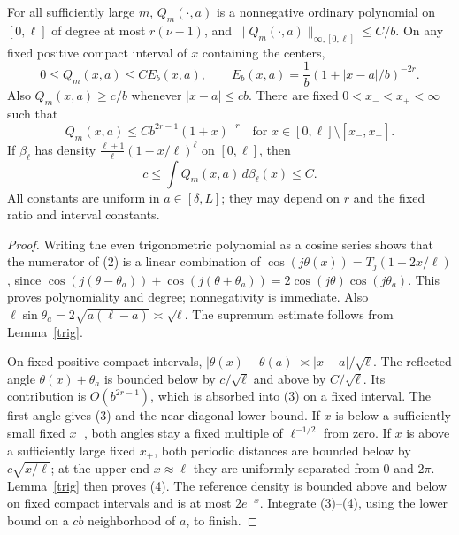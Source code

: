 \documentclass[11pt]{article}
\begin{document}
\begin{theorem}\label{kernel}
For all sufficiently large $m$, $Q_m(\cdot,a)$ is a nonnegative
ordinary polynomial on $[0,\ell]$ of degree at most $r(\nu-1)$,
and $\|Q_m(\cdot,a)\|_{\infty,[0,\ell]}\le C/b$.
On any fixed positive compact interval of $x$ containing the centers,
\[
 0\le Q_m(x,a)\le C E_b(x,a),\qquad
 E_b(x,a)=\frac1b(1+|x-a|/b)^{-2r}.                       \tag{3}
\]
Also $Q_m(x,a)\ge c/b$ whenever $|x-a|\le cb$.
There are fixed $0<x_-<x_+<\infty$ such that
\[
 Q_m(x,a)\le C b^{2r-1}(1+x)^{-r}
 \quad\text{for }x\in[0,\ell]\setminus[x_-,x_+].         \tag{4}
\]
If $\beta_\ell$ has density
$\frac{\ell+1}{\ell}(1-x/\ell)^\ell$ on $[0,\ell]$, then
\[
 c\le\int Q_m(x,a)\,d\beta_\ell(x)\le C.
\]
All constants are uniform in $a\in[\delta,L]$; they may depend on
$r$ and the fixed ratio and interval constants.
\end{theorem}
\begin{proof}
Writing the even trigonometric polynomial as a cosine series shows
that the numerator of (2) is a linear combination of
$\cos(j\theta(x))=T_j(1-2x/\ell)$, since
$\cos(j(\theta-\theta_a))+\cos(j(\theta+\theta_a))
=2\cos(j\theta)\cos(j\theta_a)$. This proves polynomiality and degree;
nonnegativity is immediate. Also
$\ell\sin\theta_a=2\sqrt{a(\ell-a)}\asymp\sqrt\ell$.
The supremum estimate follows from Lemma~\ref{trig}.

On fixed positive compact intervals,
$|\theta(x)-\theta(a)|\asymp|x-a|/\sqrt\ell$.
The reflected angle $\theta(x)+\theta_a$ is bounded below by
$c/\sqrt\ell$ and above by $C/\sqrt\ell$.
Its contribution is $O(b^{2r-1})$, which is absorbed into (3) on a
fixed interval. The first angle gives (3) and the near-diagonal lower
bound. If $x$ is below a sufficiently small fixed $x_-$, both angles
stay a fixed multiple of $\ell^{-1/2}$ from zero. If $x$ is above a
sufficiently large fixed $x_+$, both periodic distances are bounded
below by $c\sqrt{x/\ell}$; at the upper end $x\approx\ell$ they
are uniformly separated from $0$ and $2\pi$.
Lemma~\ref{trig} then proves (4).
The reference density is bounded above and below on fixed compact
intervals and is at most $2e^{-x}$. Integrate (3)--(4), using the
lower bound on a $cb$ neighborhood of $a$, to finish.
\end{proof}
\end{document}
